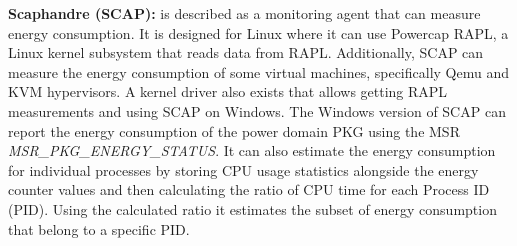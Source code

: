 \noindent\textbf{Scaphandre (SCAP):} is described as a monitoring agent that can measure energy consumption.\cite{scaphandre} It is designed for Linux where it can use Powercap RAPL, a Linux kernel subsystem that reads data from RAPL. Additionally, SCAP can measure the energy consumption of some virtual machines, specifically Qemu and KVM hypervisors. A kernel driver also exists that allows getting RAPL measurements and using SCAP on Windows\cite{RAPL_Windows}. %
The Windows version of SCAP can report the energy consumption of the power domain PKG using the MSR \textit{MSR\_PKG\_ENERGY\_STATUS}. It can also estimate the energy consumption for individual processes by storing CPU usage statistics alongside the energy counter values and then calculating the ratio of CPU time for each Process ID (PID). Using the calculated ratio it estimates the subset of energy consumption that belong to a specific PID.

